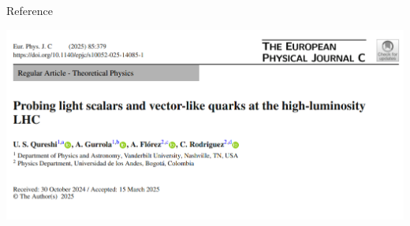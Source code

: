\documentclass{../bredelebeamer}
\begin{document}
\begin{frame}{Reference}
	\begin{center}
		\includegraphics[width=.9\linewidth]{reference.png}
	\end{center}
\end{frame}
\end{document}
